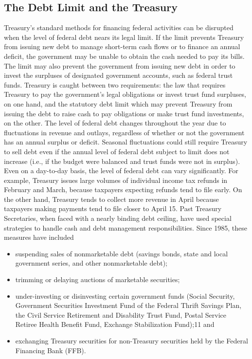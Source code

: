 \subsection{The Debt Limit and the Treasury}
Treasury’s standard methods for financing federal activities can be disrupted when the level of federal debt nears its legal limit. If the limit prevents Treasury from issuing new debt to manage short-term cash flows or to finance an annual deficit, the government may be unable to obtain the cash needed to pay its bills. The limit may also prevent the government from issuing new debt in order to invest the surpluses of designated government accounts, such as federal trust funds. Treasury is caught between two requirements: the law that requires Treasury to pay the government’s legal obligations or invest trust fund surpluses, on one hand, and the statutory debt limit which may prevent Treasury from issuing the debt to raise cash to pay obligations or make trust fund investments, on the other.
\newline \newline
The level of federal debt changes throughout the year due to fluctuations in revenue and outlays, regardless of whether or not the government has an annual surplus or deficit. Seasonal fluctuations could still require Treasury to sell debt even if the annual level of federal debt subject to limit does not increase (i.e., if the budget were balanced and trust funds were not in surplus). Even on a day-to-day basis, the level of federal debt can vary significantly. For example, Treasury issues large volumes of individual income tax refunds in February and March, because taxpayers expecting refunds tend to file early. On the other hand, Treasury tends to collect more revenue in April because taxpayers making payments tend to file closer to April 15.
\newline \newline
Past Treasury Secretaries, when faced with a nearly binding debt ceiling, have used special strategies to handle cash and debt management responsibilities.
\newline \newline
Since 1985, these measures have included
\begin{itemize}
\item suspending sales of nonmarketable debt (savings bonds, state and local government series, and other nonmarketable debt);
\item trimming or delaying auctions of marketable securities;
\item under-investing or disinvesting certain government funds (Social Security, Government Securities Investment Fund of the Federal Thrift Savings Plan, the Civil Service Retirement and Disability Trust Fund, Postal Service Retiree Health Benefit Fund, Exchange Stabilization Fund);11 and
\item exchanging Treasury securities for non-Treasury securities held by the Federal Financing Bank (FFB).
\end{itemize}

